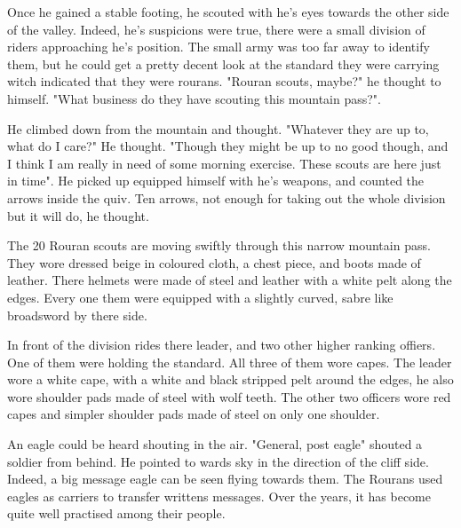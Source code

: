 Once he gained a stable footing, he scouted with he's eyes towards the other side of the valley. Indeed, he's suspicions were true, there were a small division of riders approaching he's position. The small army was too far away to identify them, but he could get a pretty decent look at the standard they were carrying witch indicated that they were rourans. "Rouran scouts, maybe?" he thought to himself. "What business do they have scouting this mountain pass?".

He climbed down from the mountain and thought. "Whatever they are up to, what do I care?" He thought. "Though they might be up to no good though, and I think I am really in need of some morning exercise. These scouts are here just in time". He picked up equipped himself with he's weapons, and counted the arrows inside the quiv. Ten arrows, not enough for taking out the whole division but it will do, he thought.

\newsect

The 20 Rouran scouts are moving swiftly through this narrow mountain pass. They wore dressed beige in coloured cloth, a chest piece, and boots made of leather. There helmets were made of steel and leather with a white pelt along the edges. Every one them were equipped with a slightly curved, sabre like broadsword by there side.

In front of the division rides there leader, and two other higher ranking offiers. One of them were holding the standard. All three of them wore capes. The leader wore a white cape, with a white and black stripped pelt around the edges, he also wore shoulder pads made of steel with wolf teeth. The other two officers wore red capes and simpler shoulder pads made of steel on only one shoulder.

An eagle could be heard shouting in the air.
"General, post eagle" shouted a soldier from behind. He pointed to wards sky in the direction of the cliff side. Indeed, a big message eagle can be seen flying towards them. The Rourans used eagles as carriers to transfer writtens messages. Over the years, it has become quite well practised among their people.
